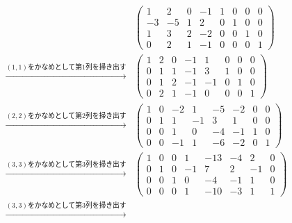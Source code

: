 \documentclass[a4paper,10pt,fleqn]{ltjsarticle}
\begin{document}
\begin{leftbar}
  \begin{align*}
                                                  &
    \left(
    \begin{array}{cccc|cccc}
        1  & 2  & 0 & -1 & 1 & 0 & 0 & 0 \\
        -3 & -5 & 1 & 2  & 0 & 1 & 0 & 0 \\
        1  & 3  & 2 & -2 & 0 & 0 & 1 & 0 \\
        0  & 2  & 1 & -1 & 0 & 0 & 0 & 1
      \end{array}
    \right)                                         \\
    \xrightarrow{\text{$(1,1)$をかなめとして第$1$列を掃き出す}} &
    \left( \begin{array}{cccc|cccc}
               1 & 2 & 0 & -1 & 1  & 0 & 0 & 0 \\
               0 & 1 & 1 & -1 & 3  & 1 & 0 & 0 \\
               0 & 1 & 2 & -1 & -1 & 0 & 1 & 0 \\
               0 & 2 & 1 & -1 & 0  & 0 & 0 & 1
             \end{array}
    \right)                                         \\
    \xrightarrow{\text{$(2,2)$をかなめとして第$2$列を掃き出す}} &
    \left( \begin{array}{cccc|cccc}
               1 & 0 & -2 & 1  & -5 & -2 & 0 & 0 \\
               0 & 1 & 1  & -1 & 3  & 1  & 0 & 0 \\
               0 & 0 & 1  & 0  & -4 & -1 & 1 & 0 \\
               0 & 0 & -1 & 1  & -6 & -2 & 0 & 1
             \end{array}
    \right)                                         \\
    \xrightarrow{\text{$(3,3)$をかなめとして第$3$列を掃き出す}} &
    \left( \begin{array}{cccc|cccc}
               1 & 0 & 0 & 1  & -13 & -4 & 2  & 0 \\
               0 & 1 & 0 & -1 & 7   & 2  & -1 & 0 \\
               0 & 0 & 1 & 0  & -4  & -1 & 1  & 0 \\
               0 & 0 & 0 & 1  & -10 & -3 & 1  & 1
             \end{array}
    \right)                                         \\
    \xrightarrow{\text{$(3,3)$をかなめとして第$3$列を掃き出す}} &

\end{align*}
\end{leftbar}
\end{document}

